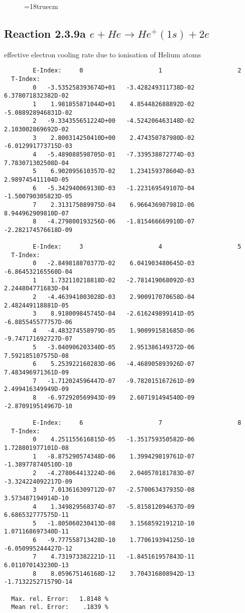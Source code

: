 \begin{figure} \label{2.1.8ro}
\epsfxsize=18truecm
\end{figure}
\newpage

\subsection{
  Reaction 2.3.9a $e + He \rightarrow He^+(1s) + 2e$
}

   effective electron cooling rate due to ionisation of Helium atoms

\begin{verbatim}
        E-Index:     0                     1                     2
  T-Index:
        0   -3.535258393674D+01   -3.428249311738D-02    6.378071832382D-02
        1    1.981855871044D+01    4.854482688892D-02   -5.088928946831D-02
        2   -9.334355651224D+00   -4.524206463148D-02    2.103002869692D-02
        3    2.800314250410D+00    2.474350787980D-02   -6.012991773715D-03
        4   -5.489088598705D-01   -7.339538872774D-03    7.783071302508D-04
        5    6.902095610357D-02    1.234159378604D-03    2.989745411104D-05
        6   -5.342940069130D-03   -1.223169549107D-04   -1.500790305823D-05
        7    2.313175089975D-04    6.966436907981D-06    8.944962909810D-07
        8   -4.279800193256D-06   -1.815466669910D-07   -2.282174576618D-09

        E-Index:     3                     4                     5
  T-Index:
        0   -2.849818870377D-02    6.041903480645D-03   -6.864532165560D-04
        1    1.732110218818D-02   -2.781419068092D-03    2.244804771683D-04
        2   -4.463941003028D-03    2.900917070658D-04    2.482449118881D-05
        3    8.918009845745D-04   -2.616249899141D-05   -6.885545577757D-06
        4   -4.483274558979D-05    1.900991581685D-06   -9.747171692727D-07
        5   -3.040906203340D-05    2.951386149372D-06    7.592185107575D-08
        6    5.253922160283D-06   -4.468905893926D-07    7.483496971361D-09
        7   -1.712024596447D-07   -9.782015167261D-09    2.499416349949D-09
        8   -6.972920569943D-09    2.607191494540D-09   -2.870919514967D-10

        E-Index:     6                     7                     8
  T-Index:
        0    4.251155616815D-05   -1.351759350582D-06    1.728801977101D-08
        1   -8.875290574348D-06    1.399429819761D-07   -1.389778740510D-10
        2   -4.278064413224D-06    2.040570181783D-07   -3.324224092217D-09
        3    7.013616309712D-07   -2.570063437935D-08    3.573487194914D-10
        4    1.349829568374D-07   -5.815812094637D-09    6.686532777575D-11
        5   -1.805060230413D-08    3.156859219121D-10    1.071168697340D-11
        6   -9.777558713428D-10    1.770619394125D-10   -6.050995244427D-12
        7    4.731973382221D-11   -1.845161957843D-11    6.011070143230D-13
        8    8.059675146168D-12    3.704316808942D-13   -1.713225271579D-14

  Max. rel. Error:   1.8148 %
  Mean rel. Error:    .1839 %

\end{verbatim}
